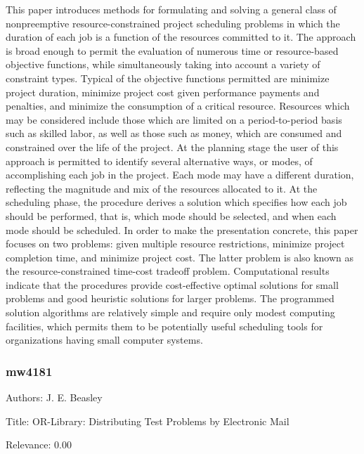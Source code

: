   This paper introduces methods for formulating and solving a general class of nonpreemptive resource-constrained project scheduling problems in which the duration of each job is a function of the resources committed to it. The approach is broad enough to permit the evaluation of numerous time or resource-based objective functions, while simultaneously taking into account a variety of constraint types. Typical of the objective functions permitted are minimize project duration, minimize project cost given performance payments and penalties, and minimize the consumption of a critical resource. Resources which may be considered include those which are limited on a period-to-period basis such as skilled labor, as well as those such as money, which are consumed and constrained over the life of the project. At the planning stage the user of this approach is permitted to identify several alternative ways, or modes, of accomplishing each job in the project. Each mode may have a different duration, reflecting the magnitude and mix of the resources allocated to it. At the scheduling phase, the procedure derives a solution which specifies how each job should be performed, that is, which mode should be selected, and when each mode should be scheduled. In order to make the presentation concrete, this paper focuses on two problems: given multiple resource restrictions, minimize project completion time, and minimize project cost. The latter problem is also known as the resource-constrained time-cost tradeoff problem.    Computational results indicate that the procedures provide cost-effective optimal solutions for small problems and good heuristic solutions for larger problems. The programmed solution algorithms are relatively simple and require only modest computing facilities, which permits them to be potentially useful scheduling tools for organizations having small computer systems.  

\subsubsection{mw4181}
\label{mw:mw4181}

Authors: J. E. Beasley

Title: OR-Library: Distributing Test Problems by Electronic Mail

Relevance:  0.00

